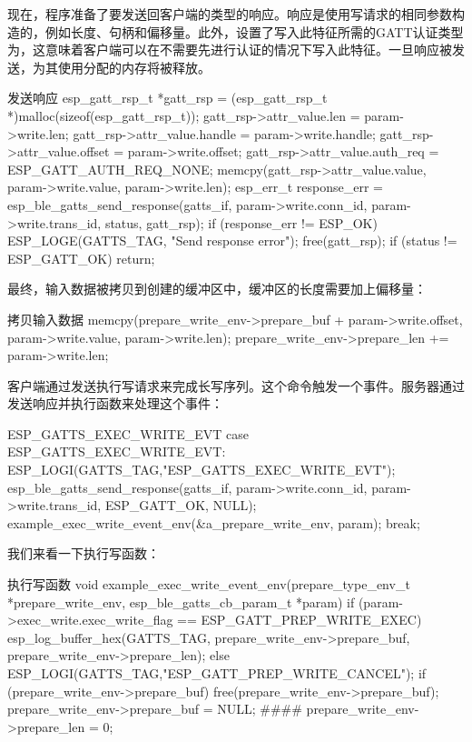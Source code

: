 \documentclass[lang=cn,newtx,10pt,scheme=chinese]{elegantbook}
\begin{document}
现在，程序准备了要发送回客户端的类型的响应。响应是使用写请求的相同参数构造的，例如长度、句柄和偏移量。此外，设置了写入此特征所需的GATT认证类型为，这意味着客户端可以在不需要先进行认证的情况下写入此特征。一旦响应被发送，为其使用分配的内存将被释放。

\begin{mycode}{发送响应}
esp_gatt_rsp_t *gatt_rsp = (esp_gatt_rsp_t *)malloc(sizeof(esp_gatt_rsp_t));
gatt_rsp->attr_value.len = param->write.len;
gatt_rsp->attr_value.handle = param->write.handle;
gatt_rsp->attr_value.offset = param->write.offset;
gatt_rsp->attr_value.auth_req = ESP_GATT_AUTH_REQ_NONE;
memcpy(gatt_rsp->attr_value.value, param->write.value, param->write.len);
esp_err_t response_err = esp_ble_gatts_send_response(gatts_if, param->write.conn_id,  
                                                     param->write.trans_id, status, gatt_rsp);
if (response_err != ESP_OK){
    ESP_LOGE(GATTS_TAG, "Send response error\n");
}
free(gatt_rsp);
if (status != ESP_GATT_OK){
    return;
}
\end{mycode}

最终，输入数据被拷贝到创建的缓冲区中，缓冲区的长度需要加上偏移量：

\begin{mycode}{拷贝输入数据}
memcpy(prepare_write_env->prepare_buf + param->write.offset,
       param->write.value,  
       param->write.len);
prepare_write_env->prepare_len += param->write.len;
\end{mycode}

客户端通过发送执行写请求来完成长写序列。这个命令触发一个事件。服务器通过发送响应并执行函数来处理这个事件：

\begin{mycode}{ESP\_GATTS\_EXEC\_WRITE\_EVT}
case ESP_GATTS_EXEC_WRITE_EVT:  
     ESP_LOGI(GATTS_TAG,"ESP_GATTS_EXEC_WRITE_EVT");  
     esp_ble_gatts_send_response(gatts_if, param->write.conn_id, param->write.trans_id, ESP_GATT_OK, NULL);  
     example_exec_write_event_env(&a_prepare_write_env, param);  
     break;
\end{mycode}

我们来看一下执行写函数：

\begin{mycode}{执行写函数}
void example_exec_write_event_env(prepare_type_env_t *prepare_write_env, esp_ble_gatts_cb_param_t *param){
    if (param->exec_write.exec_write_flag == ESP_GATT_PREP_WRITE_EXEC){
        esp_log_buffer_hex(GATTS_TAG, prepare_write_env->prepare_buf, prepare_write_env->prepare_len);
    }
    else{
        ESP_LOGI(GATTS_TAG,"ESP_GATT_PREP_WRITE_CANCEL");
    }
    if (prepare_write_env->prepare_buf) {
        free(prepare_write_env->prepare_buf);
        prepare_write_env->prepare_buf = NULL;
    }
####     prepare_write_env->prepare_len = 0;
}
\end{mycode}
\end{document}
